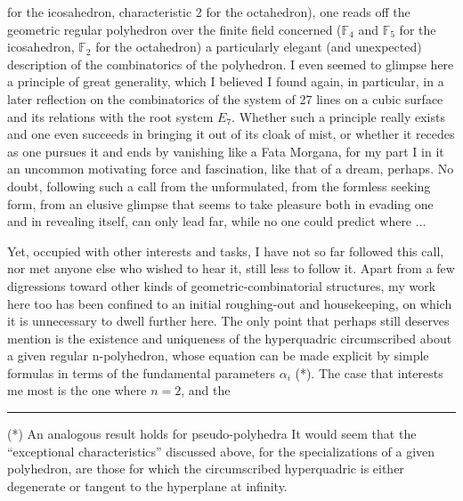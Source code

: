 
for the icosahedron, characteristic 2 for the octahedron), one reads
off the geometric regular polyhedron over the finite field concerned
($\mathbb{F}_4$ and $\mathbb{F}_5$ for the icosahedron, $\mathbb{F}_2$ for the octahedron) a particularly
elegant (and unexpected) description of the combinatorics
of the polyhedron. I even seemed to glimpse here a principle
of great generality, which I believed I found again, in particular, in
a later reflection on the combinatorics of the system of 27
lines on a cubic surface and its relations with the root
system $E_7$. Whether such a principle really exists and one
even succeeds in bringing it out of its cloak of mist, or whether it
recedes as one pursues it and ends by
vanishing like a Fata Morgana,
for my part I 
in it an uncommon motivating force and fascination,
like that of a dream, perhaps. No doubt, following such a call from the
unformulated, from the formless seeking form, from an elusive
glimpse that seems to take pleasure both in evading one and in
revealing itself, can only lead far, while no one could
predict where ...

Yet, occupied with other interests and tasks, I have
not so far followed this call, nor met anyone else
who wished to hear it, still less to follow it. Apart from
a few digressions toward other kinds of geometric-combinatorial
structures, my work here too has been confined to an initial
roughing-out and housekeeping, on which it is unnecessary
to dwell further here. The only point that perhaps still deserves
mention is the existence and uniqueness of the hyperquadric circumscribed
about a given regular n-polyhedron, whose equation can be made
explicit by simple formulas in terms of the fundamental parameters
$\alpha_i$ (*). The case that interests me most is the one where $n = 2$, and the

\rule{5cm}{0.4pt}

(*) An analogous result holds for pseudo-polyhedra It would seem
that the ``exceptional characteristics'' discussed above,
for the specializations of a given polyhedron, are those for
which the circumscribed hyperquadric is either degenerate or
tangent to the hyperplane at infinity.


